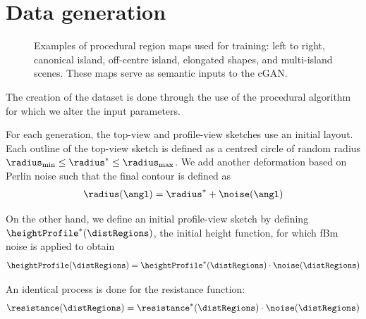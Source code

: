 
\section{Data generation}
\label{sec:coral-island-dataset-generation}



\begin{figure}
\caption{Examples of procedural region maps used for training: left to right, canonical island, off-centre island, elongated shapes, and multi-island scenes. These maps serve as semantic inputs to the cGAN.}
\label{fig:coral-island-difficulties-dataset}
\end{figure}

The creation of the dataset is done through the use of the procedural algorithm for which we alter the input parameters.

For each generation, the top-view and profile-view sketches use an initial layout. Each outline of the top-view sketch is defined as a centred circle of random radius $\radius_\text{min} \leq \radius^* \leq \radius_\text{max}$. We add another deformation based on Perlin noise such that the final contour is defined as
\begin{align}
\radius(\angl) = \radius^* + \noise(\angl)
\end{align}

On the other hand, we define an initial profile-view sketch by defining $\heightProfile^*(\distRegions)$, the initial height function, for which fBm noise is applied to obtain
\begin{align}
\heightProfile(\distRegions) = \heightProfile^*(\distRegions) \cdot \noise(\distRegions)
\end{align}

An identical process is done for the resistance function:
\begin{align}
\resistance(\distRegions) = \resistance^*(\distRegions) \cdot \noise(\distRegions)
\end{align}

